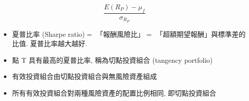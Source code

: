 \documentclass[letterpaper]{article}
\begin{document}
		$$
		\frac{E\left (R_{P}\right)-\mu_{f}}{\sigma_{R_{P}}}
		$$
		
		\begin{itemize}
			\item 夏普比率 (Sharpe ratio)$=$ 「報酬風險比」$=$ 「超額期望報酬」與標準差的比值. 夏普比率越大越好.
			\item 點 T 具有最高的夏普比率, 稱為切點投資組合 (tangency portfolio)
			\item 有效投資組合由切點投資組合與無風險資產組成
			\item 所有有效投資組合對兩種風險資產的配置比例相同, 即切點投資組合
		\end{itemize}
		
		
	
\end{document}
